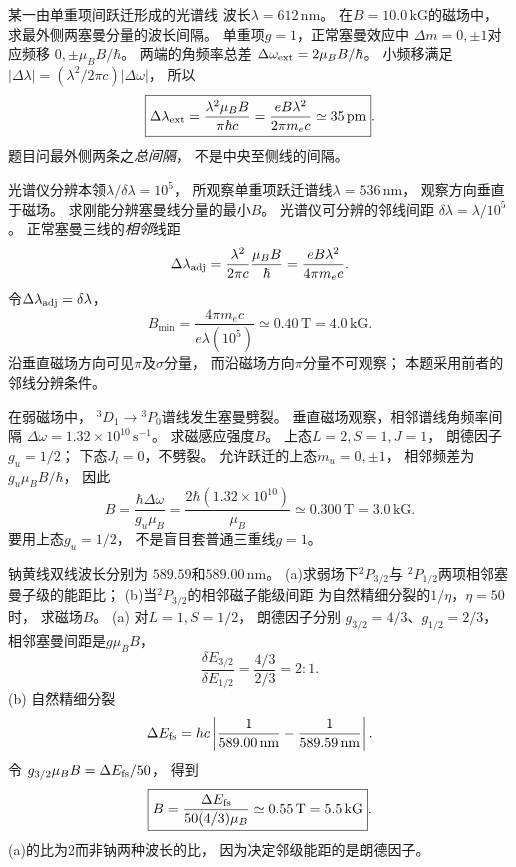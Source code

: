某一由单重项间跃迁形成的光谱线
波长$\lambda=612\,\mathrm{nm}$。
在$B=10.0\,\mathrm{kG}$的磁场中，
求最外侧两塞曼分量的波长间隔。
\exsolution
单重项$g=1$，正常塞曼效应中
$\Delta m=0,\pm1$对应频移
$0,\pm\mu_B B/\hbar$。
两端的角频率总差
$\Delta\omega_{\rm ext}=2\mu_BB/\hbar$。
小频移满足
$|\Delta\lambda|=(\lambda^2/2\pi c)|\Delta\omega|$，
所以
\[
 \boxed{\Delta\lambda_{\rm ext}=
 \frac{\lambda^2\mu_B B}{\pi\hbar c}
 =\frac{eB\lambda^2}{2\pi m_ec}
 \simeq35\,\mathrm{pm}}.
\]
\excheck 题目问最外侧两条之\emph{总间隔}，
不是中央至侧线的间隔。

光谱仪分辨本领$\lambda/\delta\lambda=10^5$，
所观察单重项跃迁谱线$\lambda=536\,\mathrm{nm}$，
观察方向垂直于磁场。
求刚能分辨塞曼线分量的最小$B$。
\exsolution
光谱仪可分辨的邻线间距
$\delta\lambda=\lambda/10^5$。
正常塞曼三线的\emph{相邻}线距
\[
 \Delta\lambda_{\rm adj}
 =\frac{\lambda^2}{2\pi c}
 \frac{\mu_BB}{\hbar}
 =\frac{eB\lambda^2}{4\pi m_ec}.
\]
令$\Delta\lambda_{\rm adj}=\delta\lambda$，
\[
 \boxed{B_{\min}=
 \frac{4\pi m_ec}{e\lambda(10^5)}
 \simeq0.40\,\mathrm T=4.0\,\mathrm{kG}}.
\]
\excheck 沿垂直磁场方向可见$\pi$及$\sigma$分量，
而沿磁场方向$\pi$分量不可观察；
本题采用前者的邻线分辨条件。

在弱磁场中，
\({}^{3}D_1\to{}^{3}P_0\)谱线发生塞曼劈裂。
垂直磁场观察，相邻谱线角频率间隔
$\Delta\omega=1.32\times10^{10}\,\mathrm{s^{-1}}$。
求磁感应强度$B$。
\exsolution
上态$L=2,S=1,J=1$，
朗德因子$g_u=1/2$；
下态$J_l=0$，不劈裂。
允许跃迁的上态$m_u=0,\pm1$，
相邻频差为$g_u\mu_BB/\hbar$，
因此
\[
 \boxed{B=\frac{\hbar\Delta\omega}{g_u\mu_B}
 =\frac{2\hbar(1.32\times10^{10})}{\mu_B}
 \simeq0.300\,\mathrm T=3.0\,\mathrm{kG}}.
\]
\excheck 要用上态$g_u=1/2$，
不是盲目套普通三重线$g=1$。

钠黄线双线波长分别为
$589.59$和$589.00\,\mathrm{nm}$。
(a)求弱场下\({}^{2}P_{3/2}\)与
\({}^{2}P_{1/2}\)两项相邻塞曼子级的能距比；
(b)当\({}^{2}P_{3/2}\)的相邻磁子能级间距
为自然精细分裂的$1/\eta$，$\eta=50$时，
求磁场$B$。
\exsolution
(a) 对$L=1,S=1/2$，
朗德因子分别
$g_{3/2}=4/3$、$g_{1/2}=2/3$，
相邻塞曼间距是$g\mu_BB$，
\[
 \boxed{\frac{\delta E_{3/2}}{\delta E_{1/2}}
 =\frac{4/3}{2/3}=2:1}.
\]
(b) 自然精细分裂
\[
 \Delta E_{\rm fs}=hc\left|
 \frac1{589.00\,\mathrm{nm}}-
 \frac1{589.59\,\mathrm{nm}}\right|.
\]
令
$g_{3/2}\mu_BB=\Delta E_{\rm fs}/50$，
得到
\[
 \boxed{B=\frac{\Delta E_{\rm fs}}
 {50(4/3)\mu_B}
 \simeq0.55\,\mathrm T=5.5\,\mathrm{kG}}.
\]
\excheck (a)的比为2而非钠两种波长的比，
因为决定邻级能距的是朗德因子。

